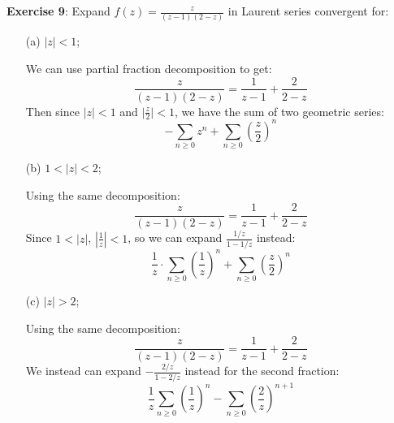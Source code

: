 \documentclass{article}
\begin{document}
\textbf{Exercise 9}: Expand $f(z) = \frac{z}{(z - 1)(2 - z)}$ in Laurent series convergent for:
    \begin{itemize}
        \item [(a)] $\lvert z \rvert < 1$;
            \begin{answer}
                We can use partial fraction decomposition to get:
                    \begin{equation*}
                        \dfrac{z}{(z - 1)(2 - z)} = \dfrac{1}{z - 1} + \dfrac{2}{2 - z}
                    \end{equation*}
                Then since $\lvert z \rvert < 1$ and $\lvert \frac{z}{2} \rvert < 1$, we have the sum of two geometric series:
                    \begin{equation*}
                        -\sum_{n \geq 0}z^{n} + \sum_{n \geq 0}\left(\dfrac{z}{2}\right)^{n}
                    \end{equation*}
            \end{answer}

        \item [(b)] $1 < \lvert z \rvert < 2$;
            \begin{answer}
                Using the same decomposition:
                    \begin{equation*}
                        \dfrac{z}{(z - 1)(2 - z)} = \dfrac{1}{z - 1} + \dfrac{2}{2 - z}
                    \end{equation*}
                Since $1 < \lvert z \rvert$, $\left\lvert \frac{1}{z} \right\rvert < 1$, so we can expand $\frac{1 / z}{1 - 1/z}$ instead:
                    \begin{equation*}
                        \dfrac{1}{z} \cdot \sum_{n \geq 0}\left(\dfrac{1}{z}\right)^{n} + \sum_{n \geq 0}\left(\dfrac{z}{2}\right)^{n}
                    \end{equation*}
            \end{answer}

        \item [(c)] $\lvert z \rvert > 2$;
            \begin{answer}
                Using the same decomposition:
                    \begin{equation*}
                        \dfrac{z}{(z - 1)(2 - z)} = \dfrac{1}{z - 1} + \dfrac{2}{2 - z}
                    \end{equation*}
                We instead can expand $-\frac{2/z}{1 - 2/z}$ instead for the second fraction:
                    \begin{equation*}
                        \dfrac{1}{z}\sum_{n \geq 0}\left(\dfrac{1}{z}\right)^{n} - \sum_{n \geq 0}\left(\dfrac{2}{z}\right)^{n + 1}
                    \end{equation*}
            \end{answer}


\end{itemize}
\end{document}
